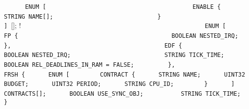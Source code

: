 {{{{{{{\lstinline!      ENUM [                                 ! \newline
\lstinline!        ENABLE {                             ! \newline
\lstinline!          STRING NAME[];                     ! \newline
\lstinline!        }                                    ! \newline
\lstinline!      ] ![];                  ! \newline
\lstinline!                                             ! \newline
\lstinline!      ENUM [                                 ! \newline
\lstinline!        FP {                                 ! \newline
\lstinline!          BOOLEAN NESTED_IRQ;                ! \newline
\lstinline!        },                                   ! \newline
\lstinline!        EDF {                                ! \newline
\lstinline!          BOOLEAN NESTED_IRQ;                ! \newline
\lstinline!          STRING TICK_TIME;                  ! \newline
\lstinline!          BOOLEAN REL_DEADLINES_IN_RAM = FALSE; ! \newline
\lstinline!        },                                   ! \newline
\lstinline!        FRSH {! \newline
\lstinline!	     ENUM [! \newline
\lstinline!	       CONTRACT {! \newline
\lstinline!		 STRING NAME;! \newline
\lstinline!		 UINT32 BUDGET;! \newline
\lstinline!		 UINT32 PERIOD;! \newline
\lstinline!		 STRING CPU_ID;! \newline
\lstinline!	       }! \newline
\lstinline!	     ] CONTRACTS[];! \newline
\lstinline!	     BOOLEAN USE_SYNC_OBJ;! \newline
\lstinline!          STRING TICK_TIME;! \newline
\lstinline!        }! \newline
\lstinline!! \newline
}}}}}}}
